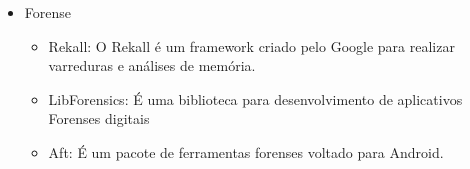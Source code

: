 \begin{itemize}
\begin{itemize}
        	\end{itemize}
        
        \item Forense
        	\begin{itemize}
        		\item Rekall: O Rekall é um framework criado pelo Google para realizar varreduras e análises de memória.
        		
        		\item LibForensics: É uma biblioteca para desenvolvimento de aplicativos Forenses digitais
        		
        		\item Aft: É um pacote de ferramentas forenses voltado para Android.
        		
        	\end{itemize}
        \end{itemize}
    
   
    	